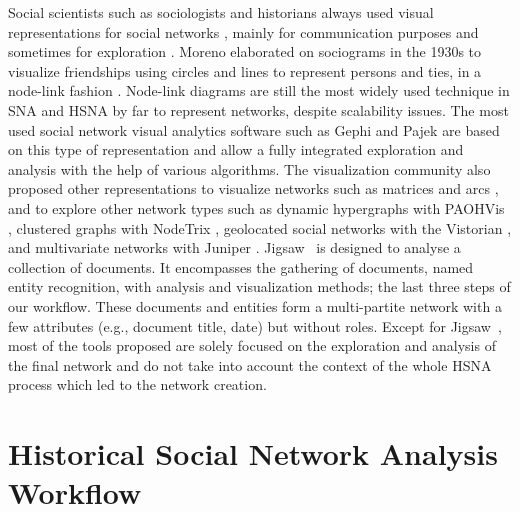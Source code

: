 Social scientists such as sociologists and historians always used visual representations for social networks \cite{cristofoliPrincipesUsagesDessins}, mainly for communication purposes and sometimes for exploration \cite{brandesExploratoryNetworkVisualization}.
Moreno elaborated on sociograms in the 1930s to visualize friendships using circles and lines to represent persons and ties, in a node-link fashion \cite{moreno_foundations_1941}. Node-link diagrams are still the most widely used technique in SNA and HSNA by far to represent networks, despite scalability issues. %
The most used social network visual analytics software such as Gephi \cite{Gephi} and Pajek \cite{batagelj_pajek_nodate} are based on this type of representation and allow a fully integrated exploration and analysis with the help of various algorithms.
The visualization community also proposed other representations to visualize networks such as matrices \cite{behrischMatrixReorderingMethods2016} and arcs \cite{dangTimeArcsVisualizingFluctuations2016}, and to explore other network types such as dynamic hypergraphs with PAOHVis \cite{valdivia_analyzing_2021}, clustered graphs with NodeTrix \cite{henry2007nodetrix}, geolocated social networks with the Vistorian \cite{vistorian_mini_questionnaires}, and multivariate networks with Juniper \cite{nobreJuniperTreeTable2019}.
Jigsaw~\cite{Stasko} is designed to analyse a collection of documents. It encompasses the gathering of documents, named entity recognition, with analysis and visualization methods; the last three steps of our workflow. These documents and entities form a multi-partite network with a few attributes (e.g., document title, date) but without roles.
Except for Jigsaw~\cite{Stasko}, most of the tools proposed are solely focused on the exploration and analysis of the final network and do not take into account the context of the whole HSNA process which led to the network creation.



\section{Historical Social Network Analysis Workflow}

